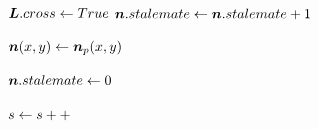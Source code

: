 \begin{algorithm}[tb!]
\begin{algorithmic}[1]
                            \State $ \bm{L}.cross \gets True $
                            \State $ \bm{n}.stalemate \gets \bm{n}.stalemate + 1 $

                            \If{$ \nodeListEachStalemate < \stalemateMax $}

                                \State $ \bm{n}(x,y) \gets \bm{n}_{p}(x,y) $

                            \Else

                                \State {}
                                \State $ \bm{n}.stalemate \gets 0 $ 

                            \EndIf
                            
                        \EndIf

                    \EndIf

                \EndFor

            \EndWhile

            \State $ s \gets s ++$

        \EndWhile

        \EndProcedure
    \end{algorithmic}
\end{algorithm}







